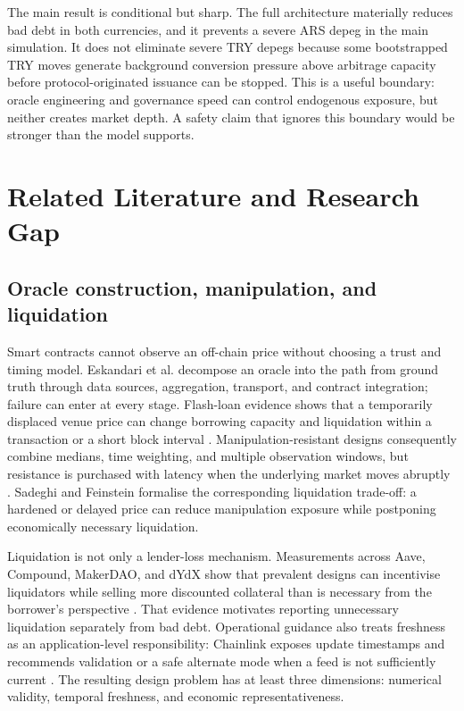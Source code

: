 \documentclass[sn-vancouver,Numbered]{sn-jnl}
\begin{document}
The main result is conditional but sharp. The full architecture materially reduces bad debt in both currencies, and it prevents a severe ARS depeg in the main simulation. It does not eliminate severe TRY depegs because some bootstrapped TRY moves generate background conversion pressure above arbitrage capacity before protocol-originated issuance can be stopped. This is a useful boundary: oracle engineering and governance speed can control endogenous exposure, but neither creates market depth. A safety claim that ignores this boundary would be stronger than the model supports.

\section{Related Literature and Research Gap}\label{sec:literature}

\subsection{Oracle construction, manipulation, and liquidation}

Smart contracts cannot observe an off-chain price without choosing a trust and timing model. Eskandari et al. \cite{Eskandari2021} decompose an oracle into the path from ground truth through data sources, aggregation, transport, and contract integration; failure can enter at every stage. Flash-loan evidence shows that a temporarily displaced venue price can change borrowing capacity and liquidation within a transaction or a short block interval \cite{Qin2021}. Manipulation-resistant designs consequently combine medians, time weighting, and multiple observation windows, but resistance is purchased with latency when the underlying market moves abruptly \cite{Bai2025}. Sadeghi and Feinstein \cite{Sadeghi2026} formalise the corresponding liquidation trade-off: a hardened or delayed price can reduce manipulation exposure while postponing economically necessary liquidation.

Liquidation is not only a lender-loss mechanism. Measurements across Aave, Compound, MakerDAO, and dYdX show that prevalent designs can incentivise liquidators while selling more discounted collateral than is necessary from the borrower's perspective \cite{QinLiquidations2021}. That evidence motivates reporting unnecessary liquidation separately from bad debt. Operational guidance also treats freshness as an application-level responsibility: Chainlink exposes update timestamps and recommends validation or a safe alternate mode when a feed is not sufficiently current \cite{ChainlinkFeeds}. The resulting design problem has at least three dimensions: numerical validity, temporal freshness, and economic representativeness.
\end{document}
